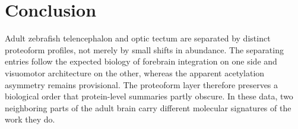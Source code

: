 \section{Conclusion}

Adult zebrafish telencephalon and optic tectum are separated by distinct proteoform profiles, not merely by small shifts in abundance. The separating entries follow the expected biology of forebrain integration on one side and visuomotor architecture on the other, whereas the apparent acetylation asymmetry remains provisional. The proteoform layer therefore preserves a biological order that protein-level summaries partly obscure. In these data, two neighboring parts of the adult brain carry different molecular signatures of the work they do.
